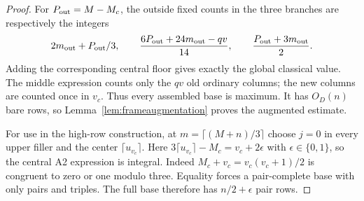 \documentclass[11pt]{article}
\begin{document}
\begin{proof}
For $P_{\rm out}=M-M_c$, the outside fixed counts in the three branches
are respectively the integers
\[
 2m_{\rm out}+P_{\rm out}/3,\qquad
 \frac{6P_{\rm out}+24m_{\rm out}-qv}{14},\qquad
 \frac{P_{\rm out}+3m_{\rm out}}2.
\]
Adding the corresponding central floor gives exactly the global classical
value. The middle expression counts only the $qv$ old ordinary columns;
the new columns are counted once in $v_c$. Thus every assembled base is
maximum. It has $O_D(n)$ bare rows, so
Lemma~\ref{lem:frameaugmentation} proves the augmented estimate.

For use in the high-row construction, at $m=\lceil(M+n)/3\rceil$ choose
$j=0$ in every upper filler and the center $\lceil u_{v_c}\rceil$.
Here $3\lceil u_{v_c}\rceil-M_c=v_c+2\epsilon$ with
$\epsilon\in\{0,1\}$, so the central A2 expression is integral.
Indeed $M_c+v_c=v_c(v_c+1)/2$ is congruent to zero or one modulo three.
Equality forces a pair-complete base with only pairs and triples.
The full base therefore has $n/2+\epsilon$ pair rows.
\end{proof}
\end{document}
